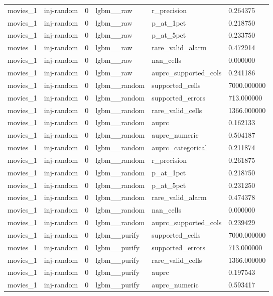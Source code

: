 \begin{tabular}{llllll}
movies\_1 & inj-random & 0 & lgbm\_\_raw & r\_precision & 0.264375 \\
movies\_1 & inj-random & 0 & lgbm\_\_raw & p\_at\_1pct & 0.218750 \\
movies\_1 & inj-random & 0 & lgbm\_\_raw & p\_at\_5pct & 0.233750 \\
movies\_1 & inj-random & 0 & lgbm\_\_raw & rare\_valid\_alarm & 0.472914 \\
movies\_1 & inj-random & 0 & lgbm\_\_raw & nan\_cells & 0.000000 \\
movies\_1 & inj-random & 0 & lgbm\_\_raw & auprc\_supported\_cols & 0.241186 \\
movies\_1 & inj-random & 0 & lgbm\_\_random & supported\_cells & 7000.000000 \\
movies\_1 & inj-random & 0 & lgbm\_\_random & supported\_errors & 713.000000 \\
movies\_1 & inj-random & 0 & lgbm\_\_random & rare\_valid\_cells & 1366.000000 \\
movies\_1 & inj-random & 0 & lgbm\_\_random & auprc & 0.162133 \\
movies\_1 & inj-random & 0 & lgbm\_\_random & auprc\_numeric & 0.504187 \\
movies\_1 & inj-random & 0 & lgbm\_\_random & auprc\_categorical & 0.211874 \\
movies\_1 & inj-random & 0 & lgbm\_\_random & r\_precision & 0.261875 \\
movies\_1 & inj-random & 0 & lgbm\_\_random & p\_at\_1pct & 0.218750 \\
movies\_1 & inj-random & 0 & lgbm\_\_random & p\_at\_5pct & 0.231250 \\
movies\_1 & inj-random & 0 & lgbm\_\_random & rare\_valid\_alarm & 0.474378 \\
movies\_1 & inj-random & 0 & lgbm\_\_random & nan\_cells & 0.000000 \\
movies\_1 & inj-random & 0 & lgbm\_\_random & auprc\_supported\_cols & 0.239429 \\
movies\_1 & inj-random & 0 & lgbm\_\_purify & supported\_cells & 7000.000000 \\
movies\_1 & inj-random & 0 & lgbm\_\_purify & supported\_errors & 713.000000 \\
movies\_1 & inj-random & 0 & lgbm\_\_purify & rare\_valid\_cells & 1366.000000 \\
movies\_1 & inj-random & 0 & lgbm\_\_purify & auprc & 0.197543 \\
movies\_1 & inj-random & 0 & lgbm\_\_purify & auprc\_numeric & 0.593417 \\

\end{tabular}
